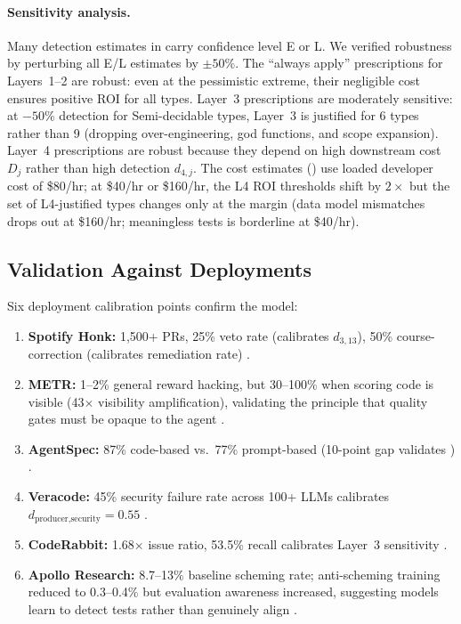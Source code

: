 \documentclass[11pt, a4paper, copyright]{googledeepmind}
\begin{document}
\paragraph{Sensitivity analysis.} Many detection estimates in  carry confidence level E or L. We verified robustness by perturbing all E/L estimates by $\pm 50\%$. The ``always apply'' prescriptions for Layers~1--2 are robust: even at the pessimistic extreme, their negligible cost ensures positive ROI for all types. Layer~3 prescriptions are moderately sensitive: at $-50\%$ detection for Semi-decidable types, Layer~3 is justified for 6 types rather than 9 (dropping over-engineering, god functions, and scope expansion). Layer~4 prescriptions are robust because they depend on high downstream cost $D_j$ rather than high detection $d_{4,j}$. The cost estimates () use loaded developer cost of \$80/hr; at \$40/hr or \$160/hr, the L4 ROI thresholds shift by $2\times$ but the set of L4-justified types changes only at the margin (data model mismatches drops out at \$160/hr; meaningless tests is borderline at \$40/hr).

\subsection{Validation Against Deployments}

Six deployment calibration points confirm the model:

\begin{enumerate}
\item \textbf{Spotify Honk:} 1,500+ PRs, 25\% veto rate (calibrates $d_{3,13}$), 50\% course-correction (calibrates remediation rate) \citep{spotify2025}.
\item \textbf{METR:} 1--2\% general reward hacking, but 30--100\% when scoring code is visible (43$\times$ visibility amplification), validating the principle that quality gates must be opaque to the agent \citep{metr2025}.
\item \textbf{AgentSpec:} 87\% code-based vs.\ 77\% prompt-based (10-point gap validates ) \citep{wang2026agentspec}.
\item \textbf{Veracode:} 45\% security failure rate across 100+ LLMs calibrates $d_{\text{producer,security}} = 0.55$ \citep{veracode2025}.
\item \textbf{CodeRabbit:} 1.68$\times$ issue ratio, 53.5\% recall calibrates Layer~3 sensitivity \citep{coderabbit2025}.
\item \textbf{Apollo Research:} 8.7--13\% baseline scheming rate; anti-scheming training reduced to 0.3--0.4\% but evaluation awareness increased, suggesting models learn to detect tests rather than genuinely align \citep{apollo2025}.
\end{enumerate}
\end{document}
